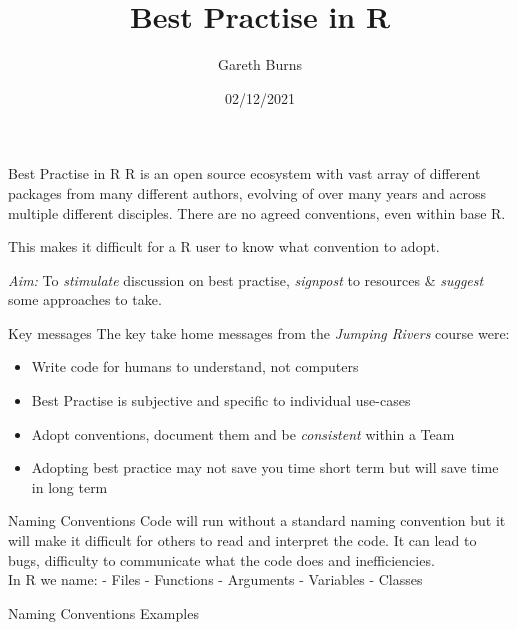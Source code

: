 \documentclass[
  ignorenonframetext,
]{beamer}
\title{Best Practise in R}
\author{Gareth Burns}
\date{02/12/2021}
\providecommand{\tightlist}{%
  \setlength{\itemsep}{0pt}\setlength{\parskip}{0pt}}
\begin{document}
\frame{\titlepage}

\begin{frame}[allowframebreaks]
  \tableofcontents[hideallsubsections]
\end{frame}
\begin{frame}{Best Practise in R}
\protect\hypertarget{best-practise-in-r}{}
R is an open source ecosystem with vast array of different packages from
many different authors, evolving of over many years and across multiple
different disciples. There are no agreed conventions, even within base
R.

This makes it difficult for a R user to know what convention to adopt.

\emph{Aim:} To \emph{stimulate} discussion on best practise,
\emph{signpost} to resources \& \emph{suggest} some approaches to take.
\end{frame}

\begin{frame}{Key messages}
\protect\hypertarget{key-messages}{}
The key take home messages from the \emph{Jumping Rivers} course were:

\begin{itemize}
\tightlist
\item
  Write code for humans to understand, not computers
\item
  Best Practise is subjective and specific to individual use-cases
\item
  Adopt conventions, document them and be \emph{consistent} within a
  Team
\item
  Adopting best practice may not save you time short term but will save
  time in long term
\end{itemize}
\end{frame}

\begin{frame}{Naming Conventions}
\protect\hypertarget{naming-conventions}{}
Code will run without a standard naming convention but it will make it
difficult for others to read and interpret the code. It can lead to
bugs, difficulty to communicate what the code does and inefficiencies.\\
In R we name: - Files - Functions - Arguments - Variables - Classes
\end{frame}

\begin{frame}{Naming Conventions Examples}
\protect\hypertarget{naming-conventions-examples}{}
\end{frame}
\end{document}
